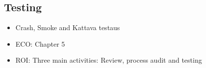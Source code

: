 
 \subsection{Testing}
 
 \begin{itemize}
 
 \item Crash, Smoke and Kattava testaus
 
 \item ECO: Chapter 5

 \item ROI: Three main activities: Review, process audit and testing
 
 \end{itemize}